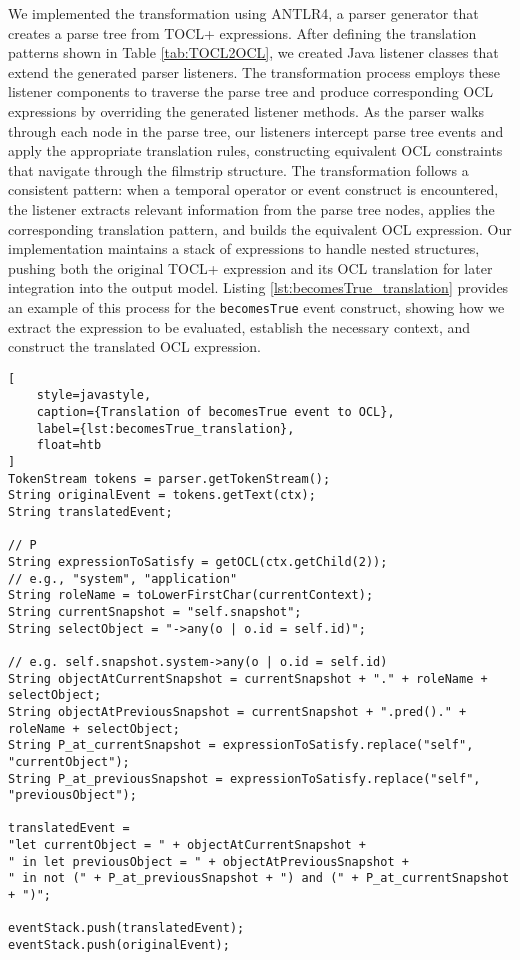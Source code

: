 We implemented the transformation using ANTLR4, a parser generator that creates a 
parse tree from TOCL+ expressions. After defining the translation patterns shown 
in Table \ref{tab:TOCL2OCL}, we created Java listener classes that extend the 
generated parser listeners. The transformation process employs these listener 
components to traverse the parse tree and produce corresponding OCL expressions 
by overriding the generated listener methods. As the parser walks through each node 
in the parse tree, our listeners intercept parse tree events and apply the appropriate 
translation rules, constructing equivalent OCL constraints that navigate through 
the filmstrip structure. The transformation follows a consistent pattern: when a 
temporal operator or event construct is encountered, the listener extracts relevant 
information from the parse tree nodes, applies the corresponding translation pattern, 
and builds the equivalent OCL expression. Our implementation maintains a stack of 
expressions to handle nested structures, pushing both the original TOCL+ expression 
and its OCL translation for later integration into the output model.
Listing \ref{lst:becomesTrue_translation} provides an example of this process for 
the \texttt{becomesTrue} event construct, showing how we extract the expression 
to be evaluated, establish the necessary context, and construct the translated OCL 
expression. 

\begin{lstlisting}[
    style=javastyle,
    caption={Translation of becomesTrue event to OCL},
    label={lst:becomesTrue_translation},
    float=htb
]
TokenStream tokens = parser.getTokenStream();
String originalEvent = tokens.getText(ctx);
String translatedEvent;

// P
String expressionToSatisfy = getOCL(ctx.getChild(2)); 
// e.g., "system", "application"
String roleName = toLowerFirstChar(currentContext); 
String currentSnapshot = "self.snapshot"; 
String selectObject = "->any(o | o.id = self.id)";

// e.g. self.snapshot.system->any(o | o.id = self.id)
String objectAtCurrentSnapshot = currentSnapshot + "." + roleName + selectObject;
String objectAtPreviousSnapshot = currentSnapshot + ".pred()." + roleName + selectObject;
String P_at_currentSnapshot = expressionToSatisfy.replace("self", "currentObject");
String P_at_previousSnapshot = expressionToSatisfy.replace("self", "previousObject");

translatedEvent = 
"let currentObject = " + objectAtCurrentSnapshot +
" in let previousObject = " + objectAtPreviousSnapshot +
" in not (" + P_at_previousSnapshot + ") and (" + P_at_currentSnapshot + ")";

eventStack.push(translatedEvent);
eventStack.push(originalEvent);    
\end{lstlisting}

